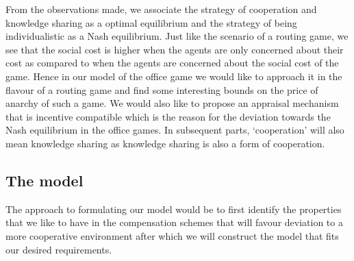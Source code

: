 \documentclass[10pt, a4paper]{article}
\begin{document}
	From the observations made, we associate the strategy of cooperation and knowledge sharing as a optimal equilibrium and the strategy of being individualistic as a Nash equilibrium. Just like the scenario of a routing game, we see that the social cost is higher when the agents are only concerned about their cost as compared to when the agents are concerned about the social cost of the game. Hence in our model of the office game we would like to approach it in the flavour of a routing game and find some interesting bounds on the price of anarchy of such a game. We would also like to propose an appraisal mechanism that is incentive compatible which is the reason for the deviation towards the Nash equilibrium in the office games. In subsequent parts, `cooperation' will also mean knowledge sharing as knowledge sharing is also a form of cooperation.
	
	 
	
	\subsection{The model}
	The approach to formulating our model would be to first identify the properties that we like to have in the compensation schemes that will favour deviation to a more cooperative environment after which we will construct the model that fits our desired requirements.
	
\end{document}
